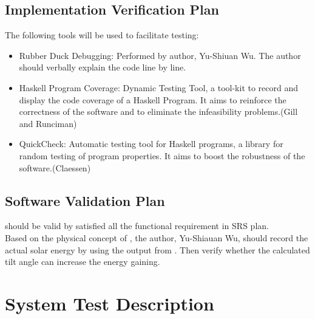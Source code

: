 \documentclass[12pt, titlepage]{article}
\begin{document}
\label{Planfordv}

\subsection{Implementation Verification Plan} 
The following tools will be used to facilitate testing: 

\begin{itemize}
\item[ ]Rubber Duck Debugging: Performed by author, Yu-Shiuan Wu. The 
author should verbally explain the code line by line.
\item[ ]Haskell Program Coverage: Dynamic Testing Tool, a tool-kit to record 
and display the code coverage of a Haskell Program. It aims to reinforce the 
correctness of the software and to eliminate the infeasibility problems.(Gill
and Runciman\cite{GillandRunciman})
\item[ ]QuickCheck: Automatic testing tool for Haskell programs, a library for
random testing of program properties. It aims to boost the robustness of the 
software.(Claessen\cite{QuickCheck})
		
\end{itemize} 

 

\subsection{Software Validation Plan}

\progname should be valid by satisfied all the functional requirement in SRS 
plan.\\
Based on the physical concept of \progname, the author, Yu-Shiauan Wu, should
record the actual solar energy by using the output from \progname. Then verify
whether the calculated tilt angle can increase the energy gaining.


\section{System Test Description}\label{STD}	
\end{document}

